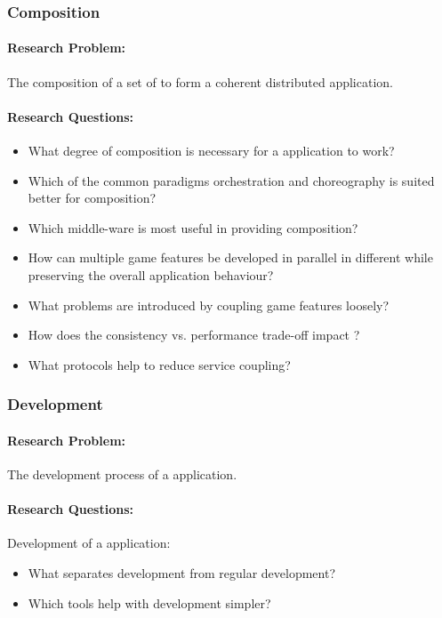 \subsubsection{\ms{} Composition}
\paragraph{Research Problem:} The composition of a set of \mss{} to form a coherent
distributed application.

\paragraph{Research Questions:}
\begin{itemize}
  \item What degree of composition is necessary for a \ms{} application
  to work?
  \item Which of the common paradigms orchestration and choreography is suited
  better for \ms{} composition?
  \item Which middle-ware is most useful in providing \ms{} composition?
  \item How can multiple game features be developed in parallel in different
\mss{} while preserving the overall application behaviour?
  \item What problems are introduced by coupling game features loosely?
  \item How does the consistency vs. performance trade-off impact \ogs{}?
  \item What protocols help to reduce service coupling?
\end{itemize}

\subsubsection{\ms{} Development}
\paragraph{Research Problem:} The development process of a \ms{} application.

\paragraph{Research Questions:}

Development of a \ms{} application:
\begin{itemize}
  \item What separates \ms{} development from regular development?
  \item Which tools help with \ms{} development simpler?
\end{itemize}

